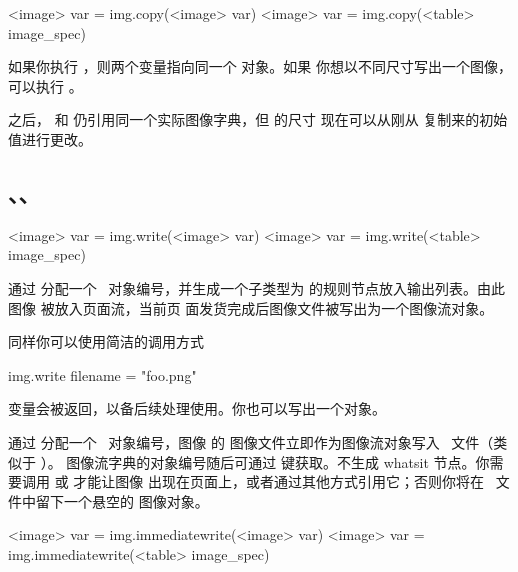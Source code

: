 
\begin{typing}
<image> var = img.copy(<image> var)
<image> var = img.copy(<table> image_spec)
\end{typing}

如果你执行 ，则两个变量指向同一个  对象。如果
你想以不同尺寸写出一个图像，可以执行 。

之后， 和  仍引用同一个实际图像字典，但  的尺寸
现在可以从刚从  复制来的初始值进行更改。

\subsection{、、}



\begin{typing}
<image> var = img.write(<image> var)
<image> var = img.write(<table> image_spec)
\end{typing}

通过  分配一个 \PDF\ 对象编号，并生成一个子类型为
 的规则节点放入输出列表。由此图像  被放入页面流，当前页
面发货完成后图像文件被写出为一个图像流对象。

同样你可以使用简洁的调用方式

\begin{typing}
img.write { filename = "foo.png" }
\end{typing}

 变量会被返回，以备后续处理使用。你也可以写出一个对象。

通过  分配一个 \PDF\ 对象编号，图像  的
图像文件立即作为图像流对象写入 \PDF\ 文件（类似于 ）。
图像流字典的对象编号随后可通过  键获取。不生成 
whatsit 节点。你需要调用  或  才能让图像
出现在页面上，或者通过其他方式引用它；否则你将在 \PDF\ 文件中留下一个悬空的
图像对象。

\begin{typing}
<image> var = img.immediatewrite(<image> var)
<image> var = img.immediatewrite(<table> image_spec)
\end{typing}

